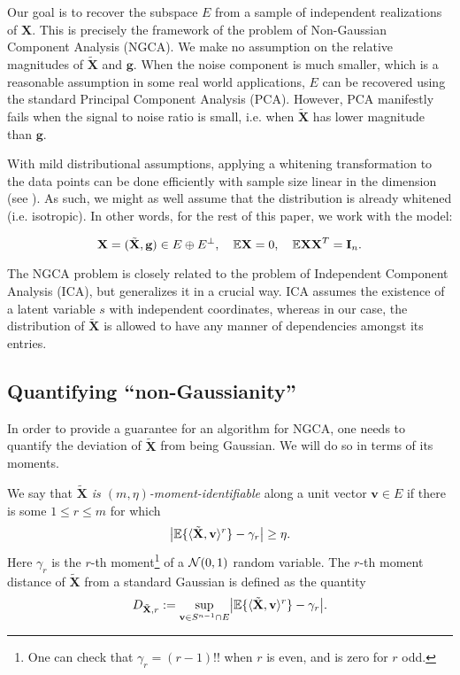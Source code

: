 \documentclass[final,12pt]{colt2018} %
\numberwithin{equation}{section}
\DeclarePairedDelimiter{\abs}{\lvert}{\rvert}
\DeclarePairedDelimiter{\paren}{(}{)}
\DeclarePairedDelimiter{\braces}{\lbrace}{\rbrace}
\DeclarePairedDelimiter{\inprod}{\langle}{\rangle}
\newcommand{\E}{\mathbb{E}}
\newcommand{\N}[2]{\mathcal{N}\paren*{#1,#2}}
\newcommand{\boldg}{\textbf{g}}
\newcommand{\boldv}{\textbf{v}}
\newcommand{\boldI}{\textbf{I}}
\newcommand{\boldX}{\textbf{X}}
\begin{document}
Our goal is to recover the subspace $E$ from a sample of independent realizations of $\boldX$. This is precisely the framework of the problem of Non-Gaussian Component Analysis (NGCA). We make no assumption on the relative magnitudes of $\tilde{\boldX}$ and $\boldg$. When the noise component is much smaller, which is a reasonable assumption in some real world applications, $E$ can be recovered using the standard Principal Component Analysis (PCA). However, PCA manifestly fails when the signal to noise ratio is small, i.e. when $\tilde{\boldX}$ has lower magnitude than $\boldg$.

With mild distributional assumptions, applying a whitening transformation to the data points can be done efficiently with sample size linear in the dimension (see \cite{Vershynin2011b}). As such, we might as well assume that the distribution is already whitened (i.e. isotropic). In other words, for the rest of this paper, we work with the model:

\begin{definition}			\label{def: NGCA model}
	\begin{equation} \label{NGCA model}
	\boldX = \paren{\tilde{\boldX},\boldg} \in E \oplus E^\perp, \quad  \E \boldX = 0, \quad \E \boldX\boldX^T = \boldI_n.
	\end{equation}
\end{definition}

The NGCA problem is closely related to the problem of Independent Component Analysis (ICA), but generalizes it in a crucial way. ICA assumes the existence of a latent variable $s$ with independent coordinates, whereas in our case, the distribution of $\tilde{\boldX}$ is allowed to have any manner of dependencies amongst its entries.

\subsection{Quantifying ``non-Gaussianity''}

In order to provide a guarantee for an algorithm for NGCA, one needs to quantify the deviation of $\tilde{\boldX}$ from being Gaussian. We will do so in terms of its moments.

\begin{definition}
	We say that \textit{$\tilde{\boldX}$ is $(m,\eta)$-moment-identifiable} along a unit vector $\boldv \in E$ if there is some $1 \leq r \leq m$ for which
	\begin{equation} \label{def:moment_identifiability}
	\abs*{\E\braces{\inprod{\tilde{\boldX},\boldv}^r} - \gamma_r} \geq \eta.
	\end{equation}
	Here $\gamma_r$ is the $r$-th moment\footnote{One can check that $\gamma_r = (r-1)!!$ when $r$ is even, and is zero for $r$ odd.} of a $\N{0}{1}$ random variable. The $r$-th moment distance of $\tilde{\boldX}$ from a standard Gaussian is defined as the quantity
	\begin{equation} \label{eq: D_X}
	D_{\tilde{\boldX},r} := \sup_{\boldv \in S^{n-1}\cap E} \abs*{\E\braces{\inprod{\tilde{\boldX},\boldv}^r} - \gamma_r}.
	\end{equation}
\end{definition}
\end{document}
